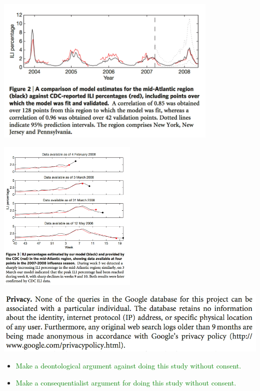 \documentclass[aspectratio=169]{beamer}
\begin{document}
\begin{frame}

\begin{center}
\includegraphics[width=0.8\textwidth]{figures/ginsberg_detecting_2009_fig2}
\end{center}

\end{frame}
\begin{frame}

\begin{center}
\includegraphics[width=0.5\textwidth]{figures/ginsberg_detecting_2009_fig3}
\end{center}

\end{frame}
\begin{frame}

\begin{center}
\includegraphics[width=\textwidth]{figures/ginsberg_detecting_2009_privacy}
\end{center}
\pause

\begin{itemize}
\item \textcolor{green}{Make a deontological argument against doing this study without consent.}
\pause
\item \textcolor{green}{Make a consequentialist argument for doing this study without consent.}
\end{itemize}

\end{frame}
\end{document}
